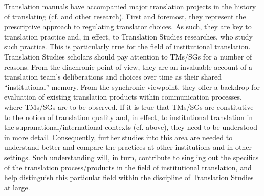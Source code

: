 \documentclass[output=paper]{langsci/langscibook}
\begin{document}
Translation manuals have accompanied major translation projects in the history of translating (cf. \citealt[142]{Kang2009} and other research). First and foremost, they represent the prescriptive approach to regulating translator choices. As such, they are key to translation practice and, in effect, to Translation Studies researches, who study such practice. This is particularly true for the field of institutional translation. Translation Studies scholars should pay attention to TMs/SGs for a number of reasons. From the diachronic point of view, they are an invaluable account of a translation team’s deliberations and choices over time as their shared “institutional” memory. From the synchronic viewpoint, they offer a backdrop for evaluation of existing translation products within communication processes, where TMs/SGs are to be observed. If it is true that TMs/SGs are constitutive to the notion of translation quality and, in effect, to institutional translation in the supranational/international contexts (cf.  above), they need to be understood in more detail. Consequently, further studies into this area are needed to understand better and compare the practices at other institutions and in other settings. Such understanding will, in turn, contribute to singling out the specifics of the translation process/products in the field of institutional translation, and help distinguish this particular field within the discipline of Translation Studies at large.

 

\sloppy
\printbibliography[heading=subbibliography,notkeyword=this] 
\end{document}
